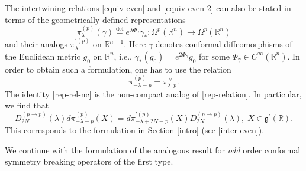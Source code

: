 \documentclass[a4paper,12pt,reqno]{amsart}
\numberwithin{theorem}{subsection}
\numberwithin{equation}{section}
\begin{document}
The intertwining relations \eqref{equiv-even} and \eqref{equiv-even-2} can also
be stated in terms of the geometrically defined representations
\begin{equation}\label{rep-geom-nc}
   \pi_\lambda^{(p)}(\gamma) {\stackrel{\text{def}}{=}} e^{\lambda \Phi_\gamma} \gamma_*:
   \Omega^p ({\mathbb{R}}^n) \to \Omega^p({\mathbb{R}}^n)
\end{equation}
and their analogs $\pi_\lambda^{\prime (p)}$ on ${\mathbb{R}}^{n-1}$. Here $\gamma$
denotes conformal diffeomorphisms of the Euclidean metric $g_0$ on ${\mathbb{R}}^n$,
i.e., $\gamma_*(g_0) = e^{2\Phi_\gamma} g_0$ for some $\Phi_\gamma \in
C^\infty({\mathbb{R}}^n)$. In order to obtain such a formulation, one has to use the
relation
\begin{equation}\label{rep-rel-nc}
   \pi_{-\lambda-p}^{(p)} = \pi_{\lambda,p}^{{\,\vee}}.
\end{equation}
The identity \eqref{rep-rel-nc} is the non-compact analog of
\eqref{rep-relation}. In particular, we find that
\begin{equation*}
   D^{(p \to p)}_{2N}(\lambda) {d}\pi^{(p)}_{-\lambda-p}(X)
   = {d}\pi^{\prime (p)}_{-\lambda+2N-p}(X) D^{(p\to p)}_{2N}(\lambda), \; X \in {{\mathfrak g}}^{\prime}({\mathbb{R}}).
\end{equation*}
This corresponds to the formulation in Section \ref{intro} (see
\eqref{inter-even}).

We continue with the formulation of the analogous result for {\em odd} order
conformal symmetry breaking operators of the first type.
\end{document}
